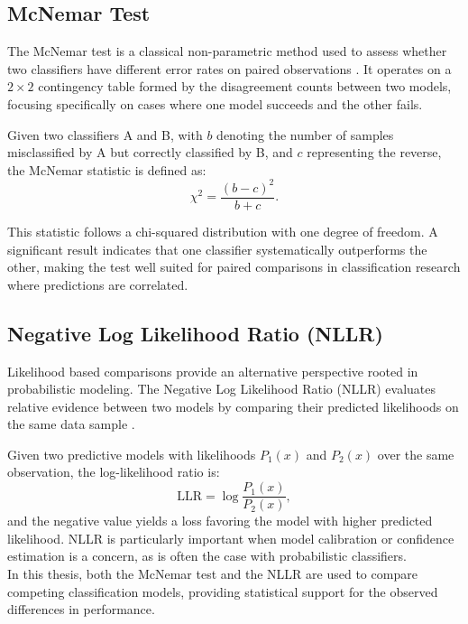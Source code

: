 \subsection{McNemar Test}

The McNemar test is a classical non-parametric method used to assess whether two classifiers have different error rates on paired observations \cite{mcnemar1947note}. It operates on a $2\times2$ contingency table formed by the disagreement counts between two models, focusing specifically on cases where one model succeeds and the other fails.

Given two classifiers A and B, with $b$ denoting the number of samples misclassified by A but correctly classified by B, and $c$ representing the reverse, the McNemar statistic is defined as:
\begin{equation}
\chi^2 = \frac{(b - c)^2}{b + c}.
\end{equation}

This statistic follows a chi-squared distribution with one degree of freedom. A significant result indicates that one classifier systematically outperforms the other, making the test well suited for paired comparisons in classification research where predictions are correlated.\\


\subsection{Negative Log Likelihood Ratio (NLLR)}

Likelihood based comparisons provide an alternative perspective rooted in probabilistic modeling. The Negative Log Likelihood Ratio (NLLR) evaluates relative evidence between two models by comparing their predicted likelihoods on the same data sample \cite{zhu2018negativeloglikelihoodratio}. 

Given two predictive models with likelihoods $P_1(x)$ and $P_2(x)$ over the same observation, the log-likelihood ratio is:
\begin{equation}
\mathrm{LLR} = \log \frac{P_1(x)}{P_2(x)},
\end{equation}
and the negative value yields a loss favoring the model with higher predicted likelihood. NLLR is particularly important when model calibration or confidence estimation is a concern, as is often the case with probabilistic classifiers.\\

In this thesis, both the McNemar test and the NLLR are used to compare competing classification models, providing statistical support for the observed differences in performance.




